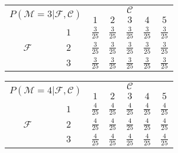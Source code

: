 \documentclass[preview]{standalone}
\newcommand{\M}{\mathcal{M}}
\newcommand{\F}{\mathcal{F}}
\newcommand{\C}{\mathcal{C}}
\begin{document}
	\begin{tabular}{|c|c|c|c|c|c|c|}
		\hline
		\multicolumn{2}{|c|}{\multirow{2}{*}{$P(\M = 3|\F,\C)$}} &                             \multicolumn{5}{c|}{$\C$}                              \\ \cline{3-7}
		\multicolumn{2}{|c|}{}                                   &      $1$       &      $2$       &      $3$       &      $4$       &      $5$       \\ \hline
		\multirow{3}{*}{$\F$} &               $1$                & $\frac{3}{25}$ & $\frac{3}{25}$ & $\frac{3}{25}$ & $\frac{3}{25}$ & $\frac{3}{25}$ \\ \cline{2-7}
		                      &               $2$                & $\frac{3}{25}$ & $\frac{3}{25}$ & $\frac{3}{25}$ & $\frac{3}{25}$ & $\frac{3}{25}$ \\ \cline{2-7}
		                      &               $3$                & $\frac{3}{25}$ & $\frac{3}{25}$ & $\frac{3}{25}$ & $\frac{3}{25}$ & $\frac{3}{25}$ \\ \hline
	\end{tabular}
	\hspace{0.5\mytextsize}
	\begin{tabular}{|c|c|c|c|c|c|c|}
		\hline
		\multicolumn{2}{|c|}{\multirow{2}{*}{$P(\M = 4|\F,\C)$}} &                             \multicolumn{5}{c|}{$\C$}                              \\ \cline{3-7}
		\multicolumn{2}{|c|}{}                                   &      $1$       &      $2$       &      $3$       &      $4$       &      $5$       \\ \hline
		\multirow{3}{*}{$\F$} &               $1$                & $\frac{4}{25}$ & $\frac{4}{25}$ & $\frac{4}{25}$ & $\frac{4}{25}$ & $\frac{4}{25}$ \\ \cline{2-7}
		                      &               $2$                & $\frac{4}{25}$ & $\frac{4}{25}$ & $\frac{4}{25}$ & $\frac{4}{25}$ & $\frac{4}{25}$ \\ \cline{2-7}
		                      &               $3$                & $\frac{4}{25}$ & $\frac{4}{25}$ & $\frac{4}{25}$ & $\frac{4}{25}$ & $\frac{4}{25}$ \\ \hline
	\end{tabular}
	\vspace{1\mytextsize} \newline
\end{document}
